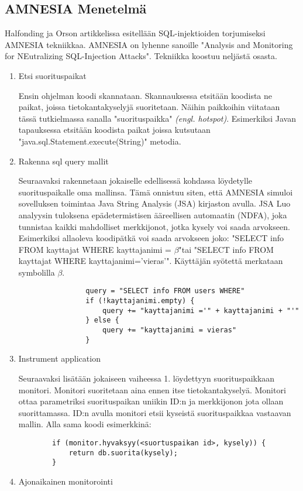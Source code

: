 \documentclass[finnish]{tktltiki2}
\theoremstyle{definition}
\theoremstyle{remark}
\begin{document}
	\pagebreak
	\subsection{AMNESIA Menetelmä}
	
	Halfonding ja Orson artikkelissa \cite{amnesia} esitellään SQL-injektioiden torjumiseksi AMNESIA tekniikkaa. AMNESIA on lyhenne sanoille "Analysis and Monitoring for NEutralizing SQL-Injection Attacks". Tekniikka koostuu neljästä osasta.
	\begin{enumerate}
		\item{Etsi suorituspaikat}
		
		Ensin ohjelman koodi skannataan. Skannauksessa etsitään koodista ne paikat, joissa tietokantakyselyjä suoritetaan. Näihin paikkoihin viitataan tässä tutkielmassa sanalla "suorituspaikka" \textit{(engl. hotspot)}. Esimerkiksi Javan tapauksessa etsitään koodista paikat joissa kutsutaan "java.sql.Statement.execute(String)" \space metodia.
		\item{Rakenna sql query mallit}
		
		Seuraavaksi rakennetaan jokaiselle edellisessä kohdassa löydetylle suorituspaikalle oma mallinsa. Tämä onnistuu siten, että AMNESIA simuloi sovelluksen toimintaa Java String Analysis (JSA) kirjaston avulla. JSA Luo analyysin tuloksena epädetermistisen ääreellisen automaatin (NDFA), joka tunnistaa kaikki mahdolliset merkkijonot, jotka kysely voi saada arvokseen. Esimerkiksi allaoleva koodipätkä voi saada arvokseen joko: 
		"SELECT info FROM kayttajat WHERE kayttajanimi = $\beta$"\space tai "SELECT info FROM kayttajat WHERE kayttajanimi='vieras'". Käyttäjän syötettä merkataan symbolilla $\beta$.
		
				\begin{lstlisting}
				query = "SELECT info FROM users WHERE"
				if (!kayttajanimi.empty) {
					query += "kayttajanimi ='" + kayttajanimi + "'"
				} else {
					query += "kayttajanimi = vieras"
				}
				\end{lstlisting}
		

		\item{Instrument application}
		
		Seuraavaksi lisätään jokaiseen vaiheessa 1. löydettyyn suorituspaikkaan monitori. Monitori suoritetaan aina ennen itse tietokantakyselyä. Monitori ottaa parametriksi suorituspaikan uniikin ID:n ja merkkijonon jota ollaan suorittamassa. ID:n avulla monitori etsii kyseistä suorituspaikkaa vastaavan mallin. Alla sama koodi esimerkkinä: 
		\begin{lstlisting}
		if (monitor.hyvaksyy(<suortuspaikan id>, kysely)) {
			return db.suorita(kysely);
		}
		\end{lstlisting}
		\item{Ajonaikainen monitorointi}
		

\end{enumerate}
\end{document}
